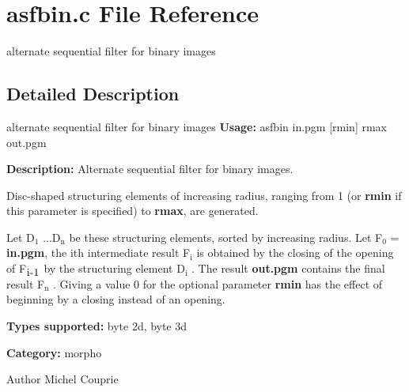 \section{asfbin.c File Reference}
\label{asfbin_8c}


alternate sequential filter for binary images  




\subsection{Detailed Description}
alternate sequential filter for binary images {\bfseries Usage:} asfbin in.pgm [rmin] rmax out.pgm

{\bfseries Description:} Alternate sequential filter for binary images.

Disc-\/shaped structuring elements of increasing radius, ranging from 1 (or {\bfseries rmin} if this parameter is specified) to {\bfseries rmax}, are generated.

Let D$_{\mbox{1}}$ ...D$_{\mbox{n}}$  be these structuring elements, sorted by increasing radius. Let F$_{\mbox{0}}$  = {\bfseries in.pgm}, the ith intermediate result F$_{\mbox{i}}$  is obtained by the closing of the opening of F$_{\mbox{i-\/1}}$  by the structuring element D$_{\mbox{i}}$ . The result {\bfseries out.pgm} contains the final result F$_{\mbox{n}}$ . Giving a value 0 for the optional parameter {\bfseries rmin} has the effect of beginning by a closing instead of an opening.

{\bfseries Types supported:} byte 2d, byte 3d

{\bfseries Category:} morpho

\begin{DoxyAuthor}{Author}
Michel Couprie 
\end{DoxyAuthor}

